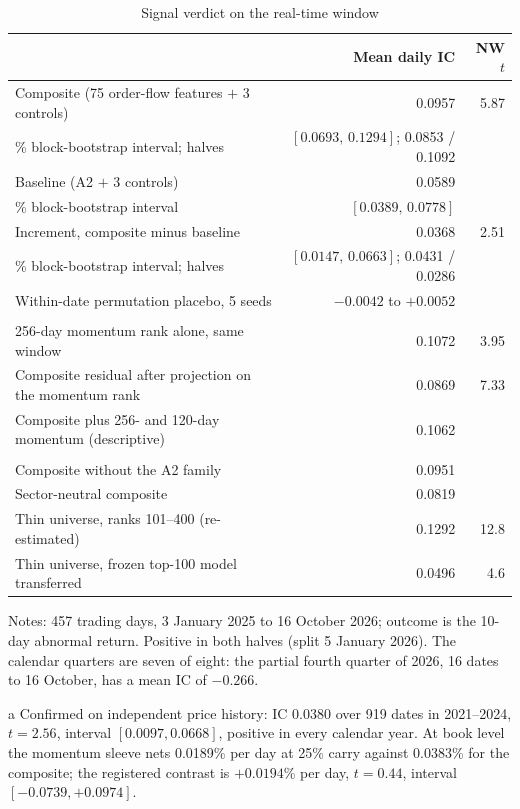 \begin{table}[htbp]
\centering
\begin{threeparttable}
\caption{Signal verdict on the real-time window}\label{tab:signal}
\small
\begin{tabularx}{\textwidth}{@{}L r r@{}}
\toprule
 & Mean daily IC & NW $t$ \\
\midrule
Composite (75 order-flow features $+$ 3 controls) & 0.0957 & 5.87 \\
\% block-bootstrap interval; halves & $[0.0693,\,0.1294]$; 0.0853 / 0.1092 & \\
Baseline (A2 $+$ 3 controls) & 0.0589 & \\
\% block-bootstrap interval & $[0.0389,\,0.0778]$ & \\
Increment, composite minus baseline & 0.0368 & 2.51 \\
\% block-bootstrap interval; halves & $[0.0147,\,0.0663]$; 0.0431 / 0.0286 & \\
Within-date permutation placebo, 5 seeds & $-0.0042$ to $+0.0052$ & \\
\addlinespace
{} \\
256-day momentum rank alone, same window & 0.1072 & 3.95 \\
Composite residual after projection on the momentum rank & 0.0869 & 7.33 \\
Composite plus 256- and 120-day momentum (descriptive) & 0.1062 & \\
\addlinespace
{} \\
Composite without the A2 family & 0.0951 & \\
Sector-neutral composite & 0.0819 & \\
Thin universe, ranks 101--400 (re-estimated) & 0.1292 & 12.8 \\
Thin universe, frozen top-100 model transferred & 0.0496 & 4.6 \\
\bottomrule
\end{tabularx}
\begin{tablenotes}\footnotesize
\item Notes: 457 trading days, 3 January 2025 to 16 October 2026; outcome is the 10-day abnormal return. Positive in both halves (split 5 January 2026). The calendar quarters are seven of eight: the partial fourth quarter of 2026, 16 dates to 16 October, has a mean IC of $-0.266$.
\item[a] Confirmed on independent price history: IC 0.0380 over 919 dates in 2021--2024, $t=2.56$, interval $[0.0097,0.0668]$, positive in every calendar year. At book level the momentum sleeve nets 0.0189\% per day at 25\% carry against 0.0383\% for the composite; the registered contrast is $+0.0194$\% per day, $t=0.44$, interval $[-0.0739,+0.0974]$.

\end{tablenotes}
\end{threeparttable}
\end{table}
